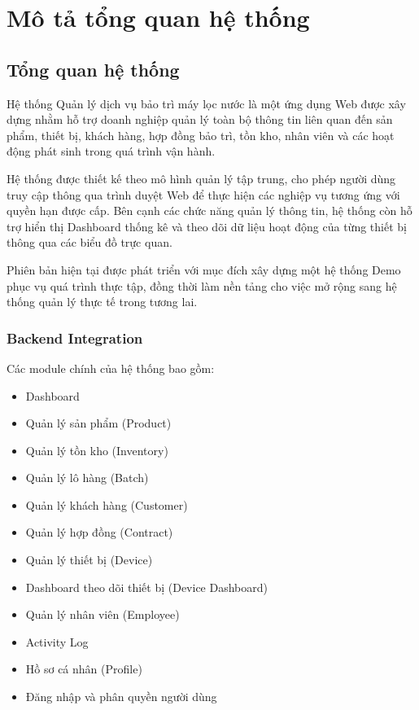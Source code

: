 \chapter{Mô tả tổng quan hệ thống}

\section{Tổng quan hệ thống}

Hệ thống Quản lý dịch vụ bảo trì máy lọc nước là một ứng dụng Web được xây dựng nhằm hỗ trợ doanh nghiệp quản lý toàn bộ thông tin liên quan đến sản phẩm, thiết bị, khách hàng, hợp đồng bảo trì, tồn kho, nhân viên và các hoạt động phát sinh trong quá trình vận hành.

Hệ thống được thiết kế theo mô hình quản lý tập trung, cho phép người dùng truy cập thông qua trình duyệt Web để thực hiện các nghiệp vụ tương ứng với quyền hạn được cấp. Bên cạnh các chức năng quản lý thông tin, hệ thống còn hỗ trợ hiển thị Dashboard thống kê và theo dõi dữ liệu hoạt động của từng thiết bị thông qua các biểu đồ trực quan.

Phiên bản hiện tại được phát triển với mục đích xây dựng một hệ thống Demo phục vụ quá trình thực tập, đồng thời làm nền tảng cho việc mở rộng sang hệ thống quản lý thực tế trong tương lai.

\subsection*{Backend Integration}


Các module chính của hệ thống bao gồm:

\begin{itemize}
    \item Dashboard
    \item Quản lý sản phẩm (Product)
    \item Quản lý tồn kho (Inventory)
    \item Quản lý lô hàng (Batch)
    \item Quản lý khách hàng (Customer)
    \item Quản lý hợp đồng (Contract)
    \item Quản lý thiết bị (Device)
    \item Dashboard theo dõi thiết bị (Device Dashboard)
    \item Quản lý nhân viên (Employee)
    \item Activity Log
    \item Hồ sơ cá nhân (Profile)
    \item Đăng nhập và phân quyền người dùng
\end{itemize}

